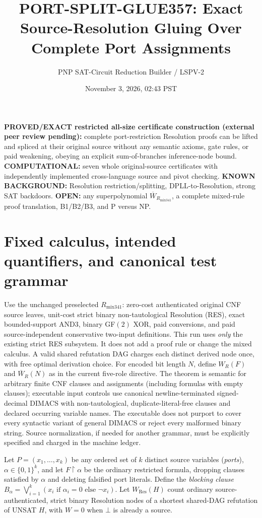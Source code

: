 \documentclass[11pt]{article}
\title{PORT-SPLIT-GLUE357: Exact Source-Resolution Gluing Over Complete Port Assignments}
\author{PNP SAT-Circuit Reduction Builder / LSPV-2}
\date{November 3, 2026, 02:43 PST}
\begin{document}
\maketitle
\noindent\textbf{PROVED/EXACT restricted all-size certificate construction (external peer review pending):} complete port-restriction Resolution proofs can be lifted and spliced at their original source without any semantic axioms, gate rules, or paid weakening, obeying an explicit sum-of-branches inference-node bound. \textbf{COMPUTATIONAL:} seven whole original-source certificates with independently implemented cross-language source and pivot checking. \textbf{KNOWN BACKGROUND:} Resolution restriction/splitting, DPLL-to-Resolution, strong SAT backdoors. \textbf{OPEN:} any superpolynomial $\overline W_{R_{\mathrm{mix341}}}$, a complete mixed-rule proof translation, B1/B2/B3, and P versus NP.

\section*{Fixed calculus, intended quantifiers, and canonical test grammar}
Use the unchanged preselected $R_{\mathrm{mix341}}$: zero-cost authenticated original CNF source leaves, unit-cost strict binary non-tautological Resolution (RES), exact bounded-support AND3, binary GF$(2)$ XOR, paid conversions, and paid source-independent conservative two-input definitions. This run uses \emph{only} the existing strict RES subsystem. It does not add a proof rule or change the mixed calculus. A valid shared refutation DAG charges each distinct derived node once, with free optimal derivation choice. For encoded bit length $N$, define $W_R(F)$ and $\overline W_R(N)$ as in the current five-role directive. The theorem is semantic for arbitrary finite CNF clauses and assignments (including formulas with empty clauses); executable input controls use canonical newline-terminated signed-decimal DIMACS with non-tautological, duplicate-literal-free clauses and declared occurring variable names. The executable does not purport to cover every syntactic variant of general DIMACS or reject every malformed binary string. Source normalization, if needed for another grammar, must be explicitly specified and charged in the machine ledger.

Let $P=(x_1,\dots,x_k)$ be any ordered set of $k$ distinct source variables (\emph{ports}), $\alpha\in\{0,1\}^k$, and let $F\upharpoonright\alpha$ be the ordinary restricted formula, dropping clauses satisfied by $\alpha$ and deleting falsified port literals. Define the \emph{blocking clause} $B_\alpha=\bigvee_{i=1}^k(x_i\text{ if }\alpha_i=0\text{ else }\neg x_i)$. Let $W_{\mathrm{Res}}(H)$ count ordinary source-authenticated, strict binary Resolution nodes of a shortest shared-DAG refutation of UNSAT $H$, with $W=0$ when $\bot$ is already a source.
\end{document}
